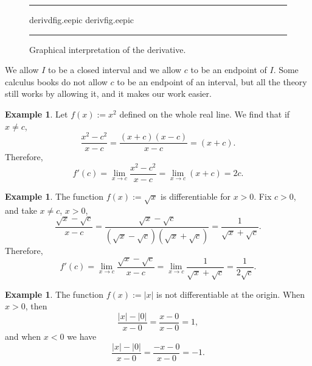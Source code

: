 \documentclass[12pt]{book}
\newenvironment{myfigureht}{%
\begin{figure}[h!t]
\noindent\rule{\textwidth}{0.4pt}\vspace{12pt}\par\centering}%
{\par\noindent\rule{\textwidth}{0.4pt}
\end{figure}}
\newcommand{\abs}[1]{\left\lvert {#1} \right\rvert}
\theoremstyle{plain}
\theoremstyle{remark}
\theoremstyle{definition}
\theoremstyle{exercise}
\theoremstyle{example}
\newtheorem{example}[thm]{Example}
\begin{document}
\begin{myfigureht}
{derivdfig.eepic}
\qquad
{derivfig.eepic}
\caption{Graphical interpretation of the derivative.\label{derivfig}}
\end{myfigureht}

We allow $I$ to be a closed interval and we allow
$c$ to be an endpoint of $I$.  Some calculus books do not allow $c$ to be an
endpoint of an interval, but all the theory still works by allowing it, and
it makes our work easier.

\begin{example}
Let $f(x) := x^2$ defined on the whole real line.  We find that if
$x \not=c$,
\begin{equation*}
\frac{x^2-c^2}{x-c} =
\frac{(x+c)(x-c)}{x-c} =
(x+c) .
\end{equation*}
Therefore,
\begin{equation*}
f'(c) = 
\lim_{x\to c} \frac{x^2-c^2}{x-c} =
\lim_{x\to c} (x+c) = 2c.
\end{equation*}
\end{example}

\begin{example}
The function $f(x) := \sqrt{x}$ is differentiable for $x > 0$.  Fix $c > 0$,
and take $x \not= c$, $x > 0$,
\begin{equation*}
\frac{\sqrt{x}-\sqrt{c}}{x-c}
=
\frac{\sqrt{x}-\sqrt{c}}{(\sqrt{x}-\sqrt{c})(\sqrt{x}+\sqrt{c})}
=
\frac{1}{\sqrt{x}+\sqrt{c}} .
\end{equation*}
Therefore,
\begin{equation*}
f'(c) =
\lim_{x\to c}
\frac{\sqrt{x}-\sqrt{c}}{x-c}
=
\lim_{x\to c}
\frac{1}{\sqrt{x}+\sqrt{c}}
=
\frac{1}{2\sqrt{c}} .
\end{equation*}
\end{example}

\begin{example}
The function $f(x) := \abs{x}$ is not differentiable
at the origin.  When $x > 0$, then
\begin{equation*}
\frac{\abs{x}-\abs{0}}{x-0} =
\frac{x-0}{x-0} = 1 ,
\end{equation*}
and when $x < 0$ we have
\begin{equation*}
\frac{\abs{x}-\abs{0}}{x-0} =
\frac{-x-0}{x-0} = -1 .
\end{equation*}
\end{example}
\end{document}

